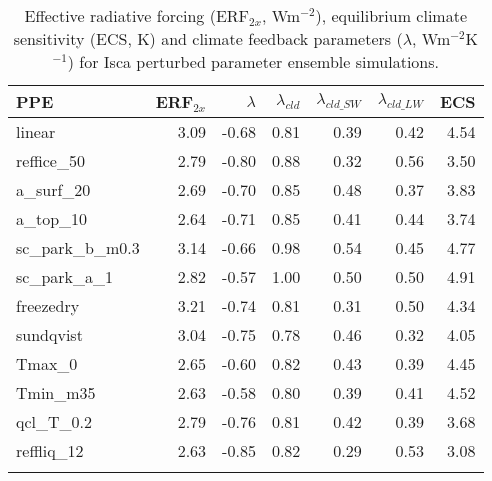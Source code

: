  \begin{table}[ht]
	\caption{Effective radiative forcing (ERF$_{2x}$, Wm$^{-2}$), equilibrium climate sensitivity (ECS, K) and climate feedback parameters ($\lambda$, Wm$^{-2}$K$^{-1}$) for Isca perturbed parameter ensemble simulations.}
	\centering
	\renewcommand{\arraystretch}{1.2}

    \begin{tabular}{lrrrrrr}
    \toprule
    {PPE} &  ERF$_{2x}$ &  $\lambda$ &  $\lambda_{cld}$ &  $\lambda_{cld\_SW}$ &  $\lambda_{cld\_LW}$ &  ECS \\
    \midrule
    linear         &    3.09 &   -0.68 &        0.81 &           0.39 &           0.42 & 4.54 \\
    reffice\_50     &    2.79 &   -0.80 &        0.88 &           0.32 &           0.56 & 3.50 \\
    a\_surf\_20      &    2.69 &   -0.70 &        0.85 &           0.48 &           0.37 & 3.83 \\
    a\_top\_10       &    2.64 &   -0.71 &        0.85 &           0.41 &           0.44 & 3.74 \\
    sc\_park\_b\_m0.3 &    3.14 &   -0.66 &        0.98 &           0.54 &           0.45 & 4.77 \\
    sc\_park\_a\_1    &    2.82 &   -0.57 &        1.00 &           0.50 &           0.50 & 4.91 \\
    freezedry      &    3.21 &   -0.74 &        0.81 &           0.31 &           0.50 & 4.34 \\
    sundqvist      &    3.04 &   -0.75 &        0.78 &           0.46 &           0.32 & 4.05 \\
    Tmax\_0         &    2.65 &   -0.60 &        0.82 &           0.43 &           0.39 & 4.45 \\
    Tmin\_m35       &    2.63 &   -0.58 &        0.80 &           0.39 &           0.41 & 4.52 \\
    qcl\_T\_0.2      &    2.79 &   -0.76 &        0.81 &           0.42 &           0.39 & 3.68 \\
    reffliq\_12     &    2.63 &   -0.85 &        0.82 &           0.29 &           0.53 & 3.08 \\
    \bottomrule
    \label{tab:ECS_forcing_feedback}
    \end{tabular}
\end{table}

